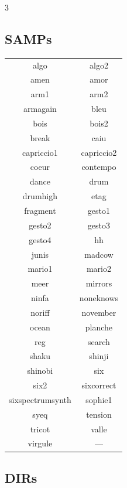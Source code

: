 \documentclass[a4paper, landscape]{book}
\begin{document}
\begin{multicols}{3}
\begin{center} \section*{SAMPs}

\begin{tabular}{ c|c } 
algo & algo2 \\
amen & amor \\
arm1 & arm2 \\
armagain & bleu \\
bois & bois2 \\
break & caiu \\
capriccio1 & capriccio2 \\
coeur & contempo \\
dance & drum \\
drumhigh & etag \\
fragment & gesto1 \\
gesto2 & gesto3 \\
gesto4 & hh \\
junis & madcow \\
mario1 & mario2 \\
meer & mirrors \\
ninfa & noneknows \\
noriff & november \\
ocean & planche \\
reg & search \\
shaku & shinji \\
shinobi & six \\
six2 & sixcorrect \\
sixspectrumsynth & sophie1 \\
syeq & tension \\
tricot & valle \\
virgule & --- \\

\end{tabular}
\end{center}
\columnbreak

\begin{center} \section*{DIRs}


\end{center}
\end{multicols}
\end{document}
